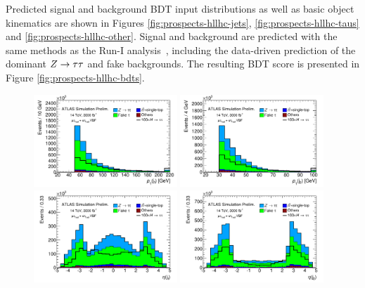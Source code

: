 Predicted signal and background BDT input distributions as well as basic object kinematics are shown in Figures \cref{fig:prospects-hllhc-jets}, \cref{fig:prospects-hllhc-taus} and \cref{fig:prospects-hllhc-other}. Signal and background are predicted with the same methods as the Run-I analysis~\cite{HIGG-2013-32}, including the data-driven prediction of the dominant $Z\rightarrow\tau\tau$ and fake backgrounds. The resulting BDT score is presented in Figure \cref{fig:prospects-hllhc-bdts}.

\begin{figure}[!htpb]
  \centering
  \includegraphics[width=0.48\textwidth]{figures/ATL-PHYS-PUB-2014-018/fig_03a}
  \includegraphics[width=0.48\textwidth]{figures/ATL-PHYS-PUB-2014-018/fig_03b}
  \includegraphics[width=0.48\textwidth]{figures/ATL-PHYS-PUB-2014-018/fig_03c}
  \includegraphics[width=0.48\textwidth]{figures/ATL-PHYS-PUB-2014-018/fig_03d}

\end{figure}
